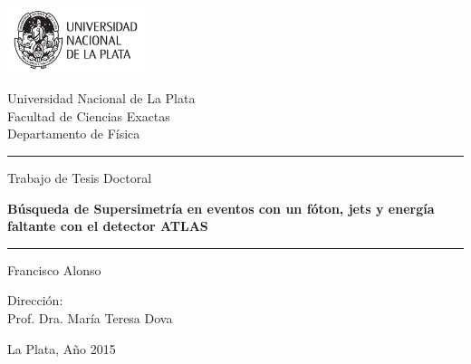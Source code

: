 \newcommand{\HRule}{\rule{\linewidth}{1pt}}

\begin{titlepage}

  \centering

  \includegraphics[width=0.30\textwidth]{figures/logo_unlp.pdf}


  \vspace{0.5cm}

  {
    \large \sc
    Universidad Nacional de La Plata \\[0.25cm]
    Facultad de Ciencias Exactas \\[0.25cm]
    Departamento de Física
  }

  \vspace{1.5cm}



  \HRule

  \vspace{0.2cm}

  {\large Trabajo de Tesis Doctoral}\\[0.5cm]

  \vspace{0.3cm}

  {
    \huge \bfseries Búsqueda de Supersimetría en eventos con un fóton,
    jets y energía faltante con el detector ATLAS\\[0.4cm]
  }

  \vspace{0.2cm}

  \HRule

  \vspace{1.5cm}

  \noindent
  Francisco Alonso

  \vspace{1cm}

  Dirección: \\
  Prof. Dra. María Teresa Dova

  \vfill

  {\large La Plata, Año 2015}

\end{titlepage}
